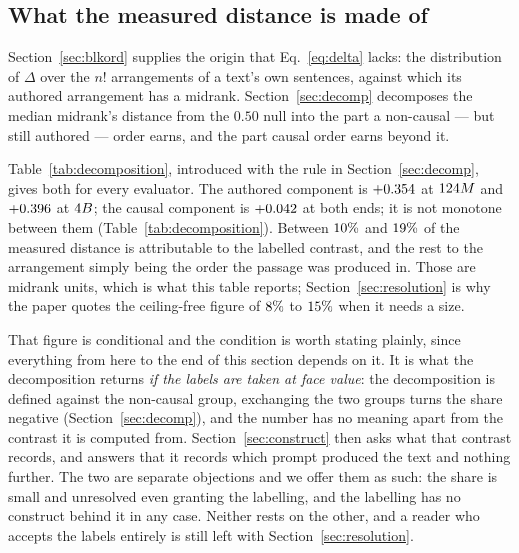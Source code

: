 %

\subsection{What the measured distance is made of}
\label{sec:contrast}

Section~\ref{sec:blkord} supplies the origin that Eq.~\eqref{eq:delta}
lacks: the distribution of $\Delta$ over the $n!$ arrangements of a text's
own sentences, against which its authored arrangement has a midrank.
Section~\ref{sec:decomp} decomposes the median midrank's distance from the
$0.50$ null into the part a non-causal --- but still authored --- order
earns, and the part causal order earns beyond it.

Table~\ref{tab:decomposition}, introduced with the rule in Section~\ref{sec:decomp}, gives both for every evaluator.  The authored
component is $+0.354$ at $124M$ and $+0.396$ at
$4B$; the causal component is $+0.042$ at both ends; it is not monotone
between them (Table~\ref{tab:decomposition}).
Between $10\%$ and $19\%$ of the measured distance is
attributable to the labelled contrast, and the rest to the arrangement
simply being the order the passage was produced in.  Those are midrank
units, which is what
this table reports; Section~\ref{sec:resolution} is why the paper quotes the
ceiling-free figure of $8\%$ to $15\%$ when it needs a size.

That figure is conditional and the condition is worth stating plainly, since
everything from here to the end of this section depends on it.  It is what
the decomposition returns \emph{if the labels are taken at face value}: the
decomposition is defined against the non-causal group, exchanging the two
groups
turns the share negative (Section~\ref{sec:decomp}), and the number has no
meaning apart from the contrast it is computed from.
Section~\ref{sec:construct} then asks what that contrast records, and
answers that it records which prompt produced the text and nothing further.
The two are separate objections and we offer them as such: the share is
small and unresolved even granting the labelling, and the labelling has no
construct behind it in any case.  Neither rests on the other, and a reader
who accepts the labels entirely is still left with
Section~\ref{sec:resolution}.

